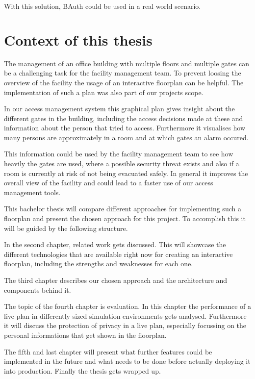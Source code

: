 With this solution, BAuth could be used in a real world scenario.

\section{Context of this thesis}
\label{Context of this thesis}

The management of an office building with multiple floors and multiple gates can be a challenging task for the facility management team. To prevent loosing the overview of the facility the usage of an interactive floorplan can be helpful. The implementation of such a plan was also part of our projects scope.

In our access management system this graphical plan gives insight about the different gates in the building, including the access decisions made at these and information about the person that tried to access. Furthermore it visualises how many persons are approximately in a room and at which gates an alarm occured. 

This information could be used by the facility management team to see how heavily the gates are used, where a possible security threat exists and also if a room is currently at risk of not being evacuated safely. 
In general it improves the overall view of the facility and could lead to a faster use of our access management tools.

This bachelor thesis will compare different approaches for implementing such a floorplan and present the chosen approach for this project. To accomplish this it will be guided by the following structure.

In the second chapter, related work gets discussed. This will showcase the different technologies that are available right now for creating an interactive floorplan, including the strengths and weaknesses for each one.

The third chapter describes our chosen approach and the architecture and components behind it.

The topic of the fourth chapter is evaluation. In this chapter the performance of a live plan in differently sized simulation environments gets analysed. Furthermore it will discuss the protection of privacy in a live plan, especially focussing on the personal informations that get shown in the floorplan.

The fifth and last chapter will present what further features could be implemented in the future and what needs to be done before actually deploying it into production. Finally the thesis gets wrapped up.